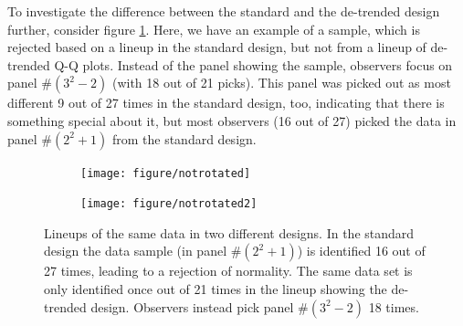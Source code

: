 \documentclass{article}\usepackage[]{graphicx}\usepackage[]{color}
\newenvironment{knitrout}{}{} %
\newcommand{\hh}[1]{{\color{magenta} #1}}
\begin{document}
% 
\hh{To investigate the difference between the standard and the de-trended design  further, consider figure \ref{fig:rotstd}. Here, we have an example of a sample, which is rejected based on a  lineup in the standard design, but not from a lineup of de-trended Q-Q plots. Instead of the panel showing the sample, observers focus on panel \#$(3^2-2)$ (with 18 out of 21 picks). This panel was picked out as most different 9 out of 27 times in the standard design, too, indicating that there is something special about it, but most observers (16 out of 27) picked the data in panel \#$(2^2+1)$ from the standard design. }
\begin{figure}[hbt]
\begin{subfigure}{0.5\textwidth}
\begin{knitrout}
\color{fgcolor}
\texttt{[image: figure/notrotated]} 

\end{knitrout}
\end{subfigure}
\begin{subfigure}{0.5\textwidth}
\begin{knitrout}
\color{fgcolor}
\texttt{[image: figure/notrotated2]} 

\end{knitrout}
\end{subfigure}
\caption{\label{fig:rotstd}Lineups of the same data in two different designs. In the standard design the data sample (in panel \#$(2^2+1)$) is identified 16 out of 27 times, leading to a rejection of normality. The same data set is only identified once out of 21 times in the lineup showing the de-trended design. Observers instead pick panel \#$(3^2-2)$ 18 times. }
\end{figure}
\end{document}
